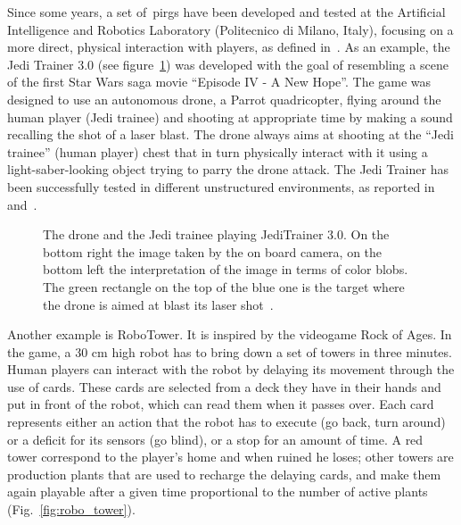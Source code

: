 Since some years, a set of~\glspl{pirg} have been developed and tested at the Artificial Intelligence and Robotics Laboratory (Politecnico di Milano, Italy), focusing on a more direct, physical interaction with players, as defined in~\cite{martinoia_physically_2013}. As an example, the Jedi Trainer 3.0 (see figure~\ref{fig:jedi_trainer}) was developed with the goal of resembling a scene of the first Star Wars saga movie ``Episode IV - A New Hope''. The game was designed to use an autonomous drone, a Parrot quadricopter, flying around the human player (Jedi trainee) and shooting at appropriate time by making a sound recalling the shot of a laser blast. The drone always aims at shooting at the ``Jedi trainee'' (human player) chest that in turn physically interact with it using a light-saber-looking object trying to parry the drone attack. The Jedi Trainer has been successfully tested in different unstructured environments, as reported in~\cite{bonarini_timing_2014} and~\cite{martinoia_physically_2013}.

\begin{figure}[h]
  \centering  
  \caption{The drone and the Jedi trainee playing JediTrainer 3.0. On the bottom right the image taken by the on board camera, on the bottom left the interpretation of the image in terms of color blobs. The green rectangle on the top of the blue one is the target where the drone is aimed at blast its laser shot~\citep{bonarini_timing_2014}.}
  \label{fig:jedi_trainer}
\end{figure}

Another example is RoboTower. It is inspired by the videogame Rock of Ages. In the game, a 30 cm high robot has to bring down a set of towers in three minutes. Human players can interact with the robot by delaying its movement through the use of cards. These cards are selected from a deck they have in their hands and put in front of the robot, which can read them when it passes over. Each card represents either an action that the robot has to execute (go back, turn around) or a deficit for its sensors (go blind), or a stop for an amount of time. A red tower correspond to the player's home and when ruined he loses; other towers are production plants that are used to recharge the delaying cards, and make them again playable after a given time proportional to the number of active plants (Fig.~\ref{fig:robo_tower}).

